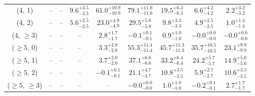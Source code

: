 \begin{table}[h!]
{\begin{tabular}{ccccccccc}
	(4, 1) & -- & -- & $9.6^{+ 3.5 }_{- 3.5 }$ & $61.0^{+ 10.9 }_{- 10.9 }$ & $79.1^{+ 11.0 }_{- 11.0 }$ & $19.5^{+ 6.3 }_{- 6.3 }$ & $6.6^{+ 4.2 }_{- 4.2 }$ & $2.2^{+ 3.2 }_{- 3.2 }$ \\[0.5ex] 
	(4, 2) & -- & -- & $5.6^{+ 2.5 }_{- 2.5 }$ & $23.0^{+ 4.9 }_{- 4.9 }$ & $29.5^{+ 5.8 }_{- 5.8 }$ & $9.8^{+ 3.3 }_{- 3.3 }$ & $4.9^{+ 2.5 }_{- 2.5 }$ & $1.0^{+ 1.4 }_{- 1.4 }$ \\[0.5ex] 
	(4, $\ge3$) & -- & -- & -- & $2.8^{+ 1.7 }_{- 1.7 }$ & $-0.1^{+ 0.1 }_{- 0.1 }$ & $0.9^{+ 1.0 }_{- 1.0 }$ & $-0.0^{+ 0.0 }_{- 0.0 }$ & $-0.0^{+ 0.0 }_{- 0.0 }$ \\[0.5ex] 
	($\ge5$, 0) & -- & -- & -- & $3.3^{+ 2.8 }_{- 2.8 }$ & $55.3^{+ 11.4 }_{- 11.4 }$ & $45.7^{+ 11.3 }_{- 11.3 }$ & $35.7^{+ 10.5 }_{- 10.5 }$ & $23.1^{+ 9.9 }_{- 9.9 }$ \\[0.5ex] 
	($\ge5$, 1) & -- & -- & -- & $3.7^{+ 2.0 }_{- 2.0 }$ & $37.1^{+ 6.6 }_{- 6.6 }$ & $33.2^{+ 6.4 }_{- 6.4 }$ & $24.2^{+ 5.7 }_{- 5.7 }$ & $14.9^{+ 5.0 }_{- 5.0 }$ \\[0.5ex] 
	($\ge5$, 2) & -- & -- & -- & $-0.1^{+ 0.1 }_{- 0.1 }$ & $21.1^{+ 4.7 }_{- 4.7 }$ & $10.8^{+ 3.5 }_{- 3.5 }$ & $5.9^{+ 2.7 }_{- 2.7 }$ & $10.6^{+ 3.5 }_{- 3.5 }$ \\[0.5ex] 
	($\ge5$, $\ge3$) & -- & -- & -- & -- & $-0.0^{+ 0.0 }_{- 0.0 }$ & $1.0^{+ 1.0 }_{- 1.0 }$ & $-0.2^{+ 0.1 }_{- 0.1 }$ & $2.7^{+ 1.7 }_{- 1.7 }$ \\[0.5ex] 
	\hline
	\hline
\end{tabular}}
\end{table}
